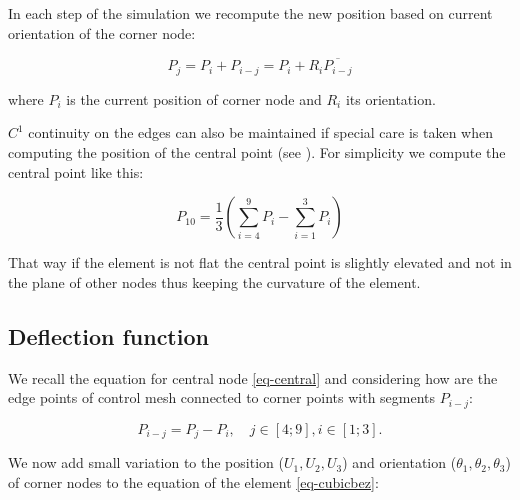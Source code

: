 \documentclass{egpubl}
\begin{document}
In each step of the simulation we recompute the new position based on 
current orientation of the corner node:

\begin{equation}
    P_j = P_i + P_{i-j} = P_i + R_i \overline{P_{i-j}}
\end{equation}

\noindent
where $P_i$ is the current position of corner node and $R_i$ its orientation.

$C^1$ continuity on the edges can also be maintained if special care is taken
when computing the position of the central point (see \cite{Ubach2010}). For
simplicity we compute the central point like this:

\begin{equation}\label{eq-central}
    P_{10} = \frac{1}{3}(\sum_{i=4}^9 P_i - \sum_{i=1}^3 P_i)
\end{equation}


That way if the element is not flat the central point is slightly elevated
and not in the plane of other nodes thus keeping the curvature of the
element.


\subsection{Deflection function} %


We recall the equation for central node \eqref{eq-central} and
considering how are the edge points of control mesh connected to corner points with
segments $P_{i-j}$:

\begin{equation}
    P_{i-j} = P_j - P_i, \quad j \in [4;9], i \in [1;3].
\end{equation}

We now add small variation to the position ($U_1, U_2, U_3$) and orientation ($\theta_1, \theta_2, \theta_3$) of corner nodes to the equation of the element \eqref{eq-cubicbez}:
\end{document}

